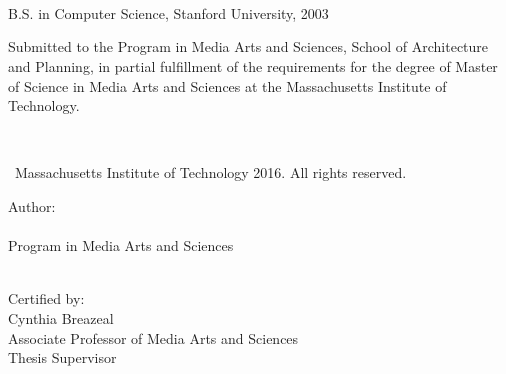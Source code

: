 \begin{titlepage}
    \begin{addmargin}[-1cm]{-2cm}
      {\setlength{\parindent}{0cm}
        \large  

        \hfill


        \begingroup
            \color{Maroon}\spacedallcaps{\myTitle} \\ 
            \mySubtitle \\ 

            \bigskip
        \endgroup



        \spacedlowsmallcaps{\myName}\\ 

        \vfill        

        {\small B.S. in Computer Science, Stanford University, 2003 } \\ \medskip

        {
            Submitted to the Program in Media Arts and Sciences, 
            School of Architecture and Planning, in partial fulfillment of the requirements 
            for the degree of Master of Science in Media Arts and Sciences at the 
            Massachusetts Institute of\\ Technology. 
        }\\ \medskip

         \\ \medskip

        \textcopyright\ Massachusetts Institute of Technology 2016. All rights reserved. \\ 

        \bigskip


        Author:\\
        \myName \\
        Program in Media Arts and Sciences \\ 
        \myTime \\ \bigskip

        Certified by:\\
        Cynthia Breazeal\\
        Associate Professor of Media Arts and Sciences\\
        Thesis Supervisor\\ \bigskip

}
\end{addmargin}
\end{titlepage}
